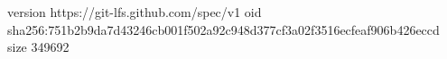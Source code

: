 version https://git-lfs.github.com/spec/v1
oid sha256:751b2b9da7d43246cb001f502a92c948d377cf3a02f3516ecfeaf906b426eccd
size 349692
